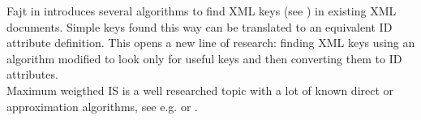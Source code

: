Fajt in \cite{fajt} introduces several algorithms to find XML keys (see \cite{keX}) in existing XML documents. Simple keys found this way can be translated to an equivalent ID attribute definition. This opens a new line of research: finding XML keys using an algorithm modified to look only for useful keys and then converting them to ID attributes.\\

Maximum weigthed IS is a well researched topic with a lot of known direct or approximation algorithms, see e.g. \cite{JM1986425} or \cite{Fomin:2009:MCA:1552285.1552286}.\\

